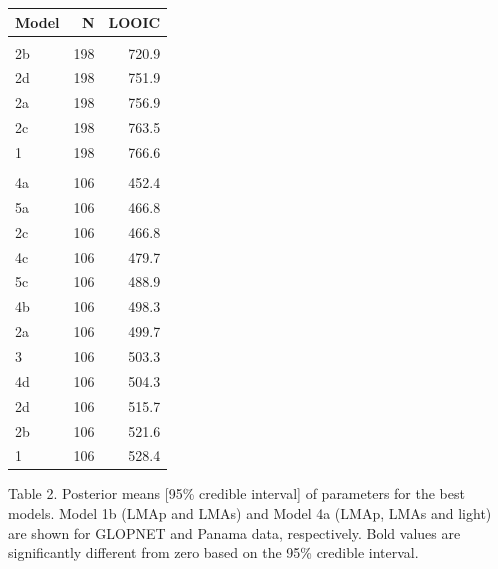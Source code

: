 \documentclass[
  12pt,
  a4paper,
,tablecaptionabove
]{scrartcl}
\begin{document}
\begin{table}
\centering
\begin{tabular}{lrr}
\toprule
Model & N & LOOIC\\
\midrule
\addlinespace[0.3em]
\multicolumn{3}{l}{\textbf{GLOPNET}}\\
\hspace{1em}2b & 198 & 720.9\\
\hspace{1em}2d & 198 & 751.9\\
\hspace{1em}2a & 198 & 756.9\\
\hspace{1em}2c & 198 & 763.5\\
\hspace{1em}1 & 198 & 766.6\\
\addlinespace[0.3em]
\multicolumn{3}{l}{\textbf{Panama}}\\
\hspace{1em}4a & 106 & 452.4\\
\hspace{1em}5a & 106 & 466.8\\
\hspace{1em}2c & 106 & 466.8\\
\hspace{1em}4c & 106 & 479.7\\
\hspace{1em}5c & 106 & 488.9\\
\hspace{1em}4b & 106 & 498.3\\
\hspace{1em}2a & 106 & 499.7\\
\hspace{1em}3 & 106 & 503.3\\
\hspace{1em}4d & 106 & 504.3\\
\hspace{1em}2d & 106 & 515.7\\
\hspace{1em}2b & 106 & 521.6\\
\hspace{1em}1 & 106 & 528.4\\
\bottomrule
\end{tabular}
\end{table}

\newpage

Table 2. Posterior means {[}95\% credible interval{]} of parameters for
the best models. Model 1b (LMAp and LMAs) and Model 4a (LMAp, LMAs and
light) are shown for GLOPNET and Panama data, respectively. Bold values
are significantly different from zero based on the 95\% credible
interval.
\end{document}
